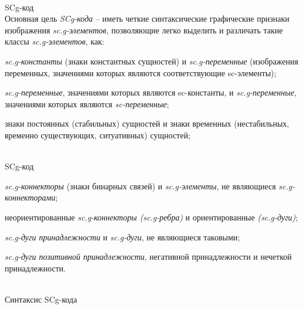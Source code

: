 \begin{frame}{\\SCg-код}
	\topline
	\justifying
	\vspace*{\fill}\\
	Основная цель \textit{SCg-кода} -- иметь четкие синтаксические графические признаки изображения \textit{sc.g-элементов}, позволяющие легко выделить и различать такие классы \textit{sc.g-элементов}, как:
	\begin{textitemize}
		\item \textit{sc.g-константы} (знаки константных сущностей) и \textit{sc.g-переменные} (изображения переменных, значениями которых являются соответствующие sc-элементы);
		\item \textit{sc.g-переменные}, значениями которых являются {sc-константы}, и \textit{sc.g-переменные}, значениями которых являются \textit{sc-переменные};
		\item знаки постоянных (стабильных) сущностей и знаки временных (нестабильных, временно существующих, ситуативных) сущностей;
	\end{textitemize}
	
\end{frame}

\begin{frame}{\\SCg-код}
	\topline
	\justifying
	\begin{textitemize}
		\item \textit{sc.g-коннекторы} (знаки бинарных связей) и \textit{sc.g-элементы}, не являющиеся \textit{sc.g-коннекторами};
		\item неориентированные \textit{sc.g-коннекторы (sc.g-ребра)} и ориентированные \textit{(sc.g-дуги)};
		\item \textit{sc.g-дуги принадлежности} и \textit{sc.g-дуги}, не являющиеся таковыми;
		\item \textit{sc.g-дуги позитивной принадлежности}, негативной принадлежности и нечеткой принадлежности.
	\end{textitemize}
\end{frame}

\begin{frame}{\\Синтаксис SCg-кода}
	\topline
	\justifying
	\begin{SCn}
	\end{SCn}
\end{frame}

